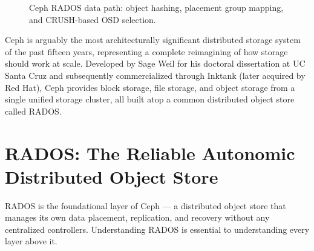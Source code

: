 \begin{figure}[htbp]
\centering
{}
\caption{Ceph RADOS data path: object hashing, placement group mapping, and CRUSH-based OSD selection.}
\label{fig:ceph-rados}
\end{figure}

Ceph is arguably the most architecturally significant distributed storage system of the past fifteen years, representing a complete reimagining of how storage should work at scale. Developed by Sage Weil for his doctoral dissertation at UC Santa Cruz and subsequently commercialized through Inktank (later acquired by Red Hat), Ceph provides block storage, file storage, and object storage from a single unified storage cluster, all built atop a common distributed object store called RADOS.

\section{RADOS: The Reliable Autonomic Distributed Object Store}
RADOS is the foundational layer of Ceph --- a distributed object store that manages its own data placement, replication, and recovery without any centralized controllers. Understanding RADOS is essential to understanding every layer above it.

